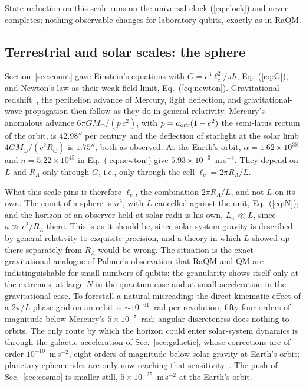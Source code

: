 \documentclass[aps,prd,twocolumn,superscriptaddress,nofootinbib,showkeys]{revtex4-2}
\newcommand{\lc}{\ell_c}
\newcommand{\RL}{R_\Lambda}
\begin{document}
State reduction on this scale runs on the universal clock (\ref{eq:clock}) and never completes; nothing observable changes for laboratory qubits, exactly as in RaQM.

\subsection{Terrestrial and solar scales: the sphere}

Section~\ref{sec:count} gave Einstein's equations with $G = c^3\lc^2/\pi\hbar$, Eq.~(\ref{eq:G}), and Newton's law as their weak-field limit, Eq.~(\ref{eq:newton}). Gravitational redshift~\cite{pound1960}, the perihelion advance of Mercury, light deflection, and gravitational-wave propagation then follow as they do in general relativity. Mercury's anomalous advance $6\pi GM_\odot/(p\,c^2)$, with $p = a_{\rm orb}(1-e^2)$ the semi-latus rectum of the orbit, is $42.98''$ per century and the deflection of starlight at the solar limb $4GM_\odot/(c^2R_\odot)$ is $1.75''$, both as observed. At the Earth's orbit, $\alpha = 1.62\times10^{38}$ and $n = 5.22\times10^{45}$ in Eq.~(\ref{eq:newton}) give $5.93\times10^{-3}$~m\,s$^{-2}$. They depend on $L$ and $\RL$ only through $G$, i.e., only through the cell $\lc = 2\pi\RL/L$.

What this scale pins is therefore $\lc$, the combination $2\pi\RL/L$, and not $L$ on its own. The count of a sphere is $n^2$, with $L$ cancelled against the unit, Eq.~(\ref{eq:N}); and the horizon of an observer held at solar radii is his own, $L_a\ll L$, since $a\gg c^2/\RL$ there. This is as it should be, since solar-system gravity is described by general relativity to exquisite precision, and a theory in which $L$ showed up there separately from $\RL$ would be wrong. The situation is the exact gravitational analogue of Palmer's observation that RaQM and QM are indistinguishable for small numbers of qubits: the granularity shows itself only at the extremes, at large $N$ in the quantum case and at small acceleration in the gravitational case. To forestall a natural misreading: the direct kinematic effect of a $2\pi/L$ phase grid on an orbit is $\sim10^{-61}$~rad per revolution, fifty-four orders of magnitude below Mercury's $5\times10^{-7}$~rad; angular discreteness does nothing to orbits. The only route by which the horizon could enter solar-system dynamics is through the galactic acceleration of Sec.~\ref{sec:galactic}, whose corrections are of order $10^{-10}$~m\,s$^{-2}$, eight orders of magnitude below solar gravity at Earth's orbit; planetary ephemerides are only now reaching that sensitivity~\cite{hees2014}. The push of Sec.~\ref{sec:cosmo} is smaller still, $5\times10^{-25}$~m\,s$^{-2}$ at the Earth's orbit.
\end{document}
